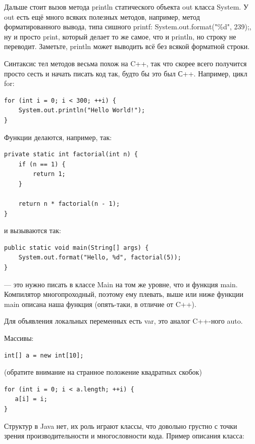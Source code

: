 \documentclass[a5paper]{article}
\begin{document}
Дальше стоит вызов метода println статического объекта out класса System. У out есть ещё много всяких полезных методов, например, метод форматированного вывода, типа сишного printf: System.out.format("\%d", 239);, ну и просто print, который делает то же самое, что и println, но строку не переводит. Заметьте, println может выводить всё без всякой форматной строки.

Синтаксис тел методов весьма похож на C++, так что скорее всего получится просто сесть и начать писать код так, будто бы это был С++. Например, цикл for:

\begin{verbatim}
for (int i = 0; i < 300; ++i) {
    System.out.println("Hello World!");
}
\end{verbatim}

Функции делаются, например, так:

\begin{verbatim}
private static int factorial(int n) {
    if (n == 1) {
        return 1;
    }

    return n * factorial(n - 1);
}
\end{verbatim}

и вызываются так:

\begin{verbatim}
public static void main(String[] args) {
    System.out.format("Hello, %d", factorial(5));
}
\end{verbatim}

--- это нужно писать в классе Main на том же уровне, что и функция main. Компилятор многопроходный, поэтому ему плевать, выше или ниже функции main описана наша функция (опять-таки, в отличие от C++).

Для объявления локальных переменных есть var, это аналог C++-ного auto.

Массивы: 

\begin{verbatim}
int[] a = new int[10]; 
\end{verbatim}

(обратите внимание на странное положение квадратных скобок)

\begin{verbatim}
for (int i = 0; i < a.length; ++i) {
   a[i] = i;
}
\end{verbatim}

Структур в Java нет, их роль играют классы, что довольно грустно с точки зрения производительности и многословности кода. Пример описания класса:
\end{document}
